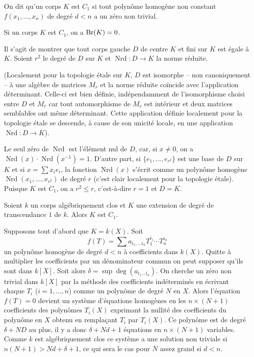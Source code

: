 \begin{definition}\label{I:3-2-1}
On dit qu'un corps $K$ est $C_1$ si tout polynôme homogène non constant 
$f(x_1,\dotsc,x_n)$ de degré $d<n$ a un zéro non trivial.
\end{definition}





\begin{proposition}\label{I:3-2-2}
Si un corps $K$ est $C_1$, on a $\operatorname{Br}(K)=0$.
\end{proposition}

Il s'agit de montrer que tout corps gauche $D$ de centre $K$ et fini sur $K$ 
est égale à $K$. Soient $r^2$ le degré de $D$ sur $K$ et 
$\operatorname{Nrd}:D\to K$ la norme réduite. 

(Localement pour la topologie étale sur $K$, $D$ est isomorphe -- non 
canoniquement -- à une algèbre de matrices $M_r$ et la norme réduite 
coïncide avec l'application déterminant. Celle-ci est bien définie, 
indépendamment de l'isomorphisme choisi entre $D$ et $M_r$ car tout 
automorphisme de $M_r$ est intérieur et deux matrices semblables ont 
même déterminant. Cette application définie localement pour la 
topologie étale se descende, à cause de son unicité locale, en une 
application $\operatorname{Nrd}:D\to K$). 

Le seul zéro de $\operatorname{Nrd}$ est l'élément nul de $D$, car, si 
$x\ne 0$, on a $\operatorname{Nrd}(x)\cdot \operatorname{Nrd}(x^{-1}) = 1$. 
D'autre part, si $\{e_1,\dotsc,e_{r^2}\}$ est une base de $D$ sur $K$ et si 
$x=\sum x_i e_i$, la fonction $\operatorname{Nrd}(x)$ s'écrit comme un polynôme 
homogène $\operatorname{Nrd}(x_1,\dotsc,x_{r^2})$ de degré $r$ (c'est 
clair localement pour la topologie étale). Puisque $K$ est $C_1$, on a 
$r^2\leqslant r$, c'est-à-dire $r=1$ et $D=K$. 





\begin{theorem}[Tsen]\label{I:3-2-3}
Soient $k$ un corps algébriquement clos et $K$ une extension de degré de 
transcendance $1$ de $k$. Alors $K$ est $C_1$.
\end{theorem}

Supposons tout d'abord que $K=k(X)$. Soit 
\[
  f(T) = \sum a_{i_1,\dotsc i_n} T_1^{i_1} \dotsm T_n^{i_n}
\]
un polynôme homogène de degré $d<n$ à coefficients dans $k(X)$. Quitte 
à multiplier les coefficients par un dénominateur commun on peut supposer 
qu'ils sont dans $k[X]$. Soit alors $\delta=\sup\deg(a_{i_1\dotsc i_n})$. On 
cherche un zéro non trivial dans $k[X]$ par la méthode des coefficients 
indéterminés en écrivant chaque $T_i$ ($i=1,\dotsc,n$) comme un 
polynôme de degré $N$ en $X$. Alors l'équation $f(T)=0$ devient un système 
d'équations homogènes en les $n\times (N+1)$ coefficients des polynômes 
$T_i(X)$ exprimant la nullité des coefficients du polynôme en $X$ obtenu en 
remplaçant $T_i$ par $T_i(X)$. Ce polynôme est de degré $\delta+N D$ au plus, 
il y a donc $\delta+N d+1$ équations en $n\times (N+1)$ variables. Comme $k$ 
est algébriquement clos ce système a une solution non triviale si 
$n(N+1)>N d+\delta+1$, ce qui sera le cas pour $N$ assez grand si $d<n$. 

